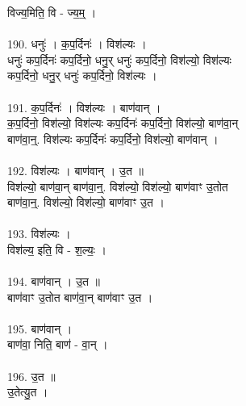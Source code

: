 विज्य॒मिति॒ वि - ज्य॒म्॒ ।\\
\\
190. धनुः॑ । क॒प॒र्दिनः॑ । विश॑ल्यः ।\\
धनुः॑ कप॒र्दिनः॑ कप॒र्दिनो॒ धनु॒र् धनुः॑ कप॒र्दिनो॒ विश॑ल्यो॒ विश॑ल्यः\\
कप॒र्दिनो॒ धनु॒र् धनुः॑ कप॒र्दिनो॒ विश॑ल्यः ।\\
\\
191. क॒प॒र्दिनः॑ । विश॑ल्यः । बाण॑वान् ।\\
क॒प॒र्दिनो॒ विश॑ल्यो॒ विश॑ल्यः कप॒र्दिनः॑ कप॒र्दिनो॒ विश॑ल्यो॒ बाण॑वा॒न्\\
बाण॑वा॒न्॒. विश॑ल्यः कप॒र्दिनः॑ कप॒र्दिनो॒ विश॑ल्यो॒ बाण॑वान् ।\\
\\
192. विश॑ल्यः । बाण॑वान् । उ॒त ॥\\
विश॑ल्यो॒ बाण॑वा॒न् बाण॑वा॒न्॒. विश॑ल्यो॒ विश॑ल्यो॒ बाण॑वाꣳ उ॒तोत\\
बाण॑वा॒न्॒. विश॑ल्यो॒ विश॑ल्यो॒ बाण॑वाꣳ उ॒त ।\\
\\
193. विश॑ल्यः ।\\
विश॑ल्य॒ इति॒ वि - श॒ल्यः॒ ।\\
\\
194. बाण॑वान् । उ॒त ॥\\
बाण॑वाꣳ उ॒तोत बाण॑वा॒न् बाण॑वाꣳ उ॒त ।\\
\\
195. बाण॑वान् ।\\
बाण॑वा॒ निति॒ बाण॑ - वा॒न् ।\\
\\
196. उ॒त ॥\\
उ॒तेत्यु॒त ।\\
\\
